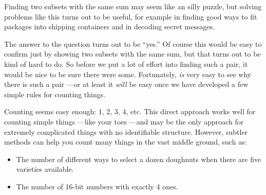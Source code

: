 Finding two subsets with the same sum may seem like an silly puzzle, but
solving problems like this turns out to be useful, for example in finding
good ways to fit packages into shipping containers and in decoding secret
messages.

The answer to the question turns out to be ``yes.''  Of course this would
be easy to confirm just by showing two subsets with the same sum, but that
turns out to be kind of hard to do.  So before we put a lot of effort into
finding such a pair, it would be nice to be sure there were some.
Fortunately, \emph{is} very easy to see why there is such a pair ---or at
least it \emph{will} be easy once we have developed a few simple rules for
counting things.


\iffalse
Can you find two such subsets?  This is a challenging computational
problem.  But we'll prove that such subsets must exist!  This is the sort
of weird conclusion one can reach by tricky use of counting, the topic of
this chapter.
\fi


Counting seems easy enough: 1, 2, 3, 4, etc.  This direct approach works
well for counting simple things ---like your toes ---and may be the only
approach for extremely complicated things with no identifiable structure.
However, subtler methods can help you count many things in the vast middle
ground, such as:

\begin{itemize}

\item The number of different ways to select a dozen doughnuts when
there are five varieties available.

\item The number of 16-bit numbers with exactly 4 ones.

\end{itemize}

